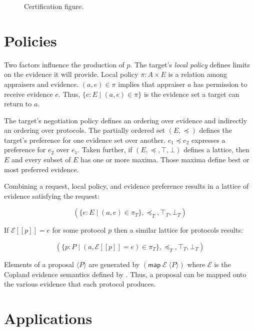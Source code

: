 \documentclass[sigconf,authordraft]{acmart}
\begin{document}
\begin{figure}[hbtp]
  \centering 
  \caption[Attestation process]{Certification figure.}
  \label{fig:certification-fig}
\end{figure}

\section{Policies}

Two factors influence the production of $p$.  The target's \emph{local
  policy} defines limits on the evidence it will provide.  Local
policy $\pi : A\times E$ is a relation among appraisers and evidence.
$(a,e)\in\pi$ implies that appraiser $a$ has permission to receive
evidence $e$.  Thus, $\{e:E\mid (a,e)\in\pi\}$ is the evidence set a
target can return to $a$.

The target's negotiation policy defines an ordering over evidence and
indirectly an ordering over protocols.  The partially ordered set
$(E,\preceq)$ defines the target's preference for one evidence set
over another. $e_1\preceq e_2$ expresses a preference for $e_2$ over
$e_1$.  Taken further, if $(E,\preceq,\top,\bot)$ defines a lattice,
then $E$ and every subset of $E$ has one or more maxima.  Those maxima
define best or most preferred evidence.

Combining a request, local policy, and evidence preference results in
a lattice of evidence satisfying the request:

\[(\{e:E\mid (a,e)\in\pi_T\},\preceq_T,\top_T,\bot_T)\]

If $\mathcal{E}[\![p]\!]=e$ for some protocol $p$ then a similar
lattice for protocols results:

\[(\{p:P\mid
  (a,\mathcal{E}[\![p]\!]=e)\in\pi_T\},\preceq_T,\top_T,\bot_T)\]


Elements of a proposal $\langle P\rangle$ are generated by
$(\mathsf{map}\; \mathcal{E}\; \langle P\rangle)$ where $\mathcal{E}$
is the Copland evidence semantics defined by \citet{Ramsdell:2019aa}.
Thus, a proposal can be mapped onto the various evidence that each
protocol produces.

\section{Applications}
\end{document}
